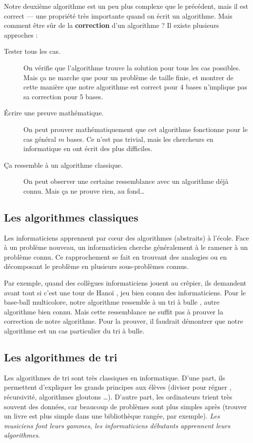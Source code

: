 Notre deuxième algorithme est un peu plus complexe que le précédent, mais il est correct --- une propriété très importante quand on écrit un algorithme. Mais comment être sûr de la \textbf{correction} d'un algorithme ? Il existe plusieurs approches :

\begin{description}
  \item[Tester tous les cas.] On vérifie que l'algorithme trouve la solution pour tous les cas possibles. Mais ça ne marche que pour un problème de taille finie, et montrer de cette manière que notre algorithme est correct pour 4 bases n'implique pas sa correction pour 5 bases.
  \item[Écrire une preuve mathématique.] On peut prouver mathématiquement que cet algorithme fonctionne pour le cas général $m$ bases. Ce n'est pas trivial, mais les chercheurs en informatique en ont écrit des plus difficiles.
  \item[Ça ressemble à un algorithme classique.] On peut observer une certaine ressemblance avec un algorithme déjà connu. Mais ça ne prouve rien, au fond{\ldots}
\end{description}

\subsection*{Les algorithmes classiques}

Les informaticiens apprennent par c\oe{}ur des algorithmes (abstraits) à l'école. Face à un problème nouveau, un informaticien cherche généralement à le ramener à un problème connu. Ce rapprochement se fait en trouvant des analogies ou en décomposant le problème en plusieurs sous-problèmes connus.

Par exemple, quand des collègues informaticiens jouent au crêpier, ils demandent avant tout si c'est \og une tour de Hanoï \fg, jeu bien connu des informaticiens. Pour le base-ball multicolore, notre algorithme ressemble à un \og tri à bulle \fg, autre algorithme bien connu. Mais cette ressemblance ne suffit pas à prouver la correction de notre algorithme. Pour la prouver, il faudrait démontrer que notre algorithme est un cas particulier du tri à bulle.
 
\subsection*{Les algorithmes de tri}

Les algorithmes de tri sont très classiques en informatique. D'une part, ils permettent d'expliquer les grands principes aux élèves (\og diviser pour régner \fg, récursivité, algorithmes gloutons {\ldots}). D'autre part, les ordinateurs trient très souvent des données, car beaucoup de problèmes sont plus simples après (trouver un livre est plus simple dans une bibliothèque rangée, par exemple). \textit{Les musiciens font leurs gammes, les informaticiens débutants apprennent leurs algorithmes}.


